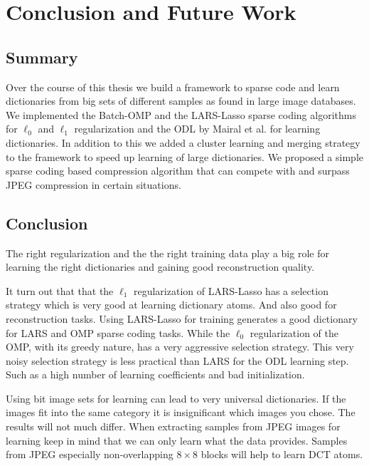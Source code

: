\chapter{Conclusion and Future Work}

\section{Summary}
Over the course of this thesis we build a framework to sparse code and learn
dictionaries from big sets of different samples as found in large image
databases. We implemented the Batch-OMP and the LARS-Lasso sparse coding
algorithms for $\ell_0$ and $\ell_1$ regularization and the ODL by Mairal et
al. for learning dictionaries. 
In addition to this we added a cluster learning and merging strategy to the
framework to speed up learning of large dictionaries.
We proposed a simple sparse coding based compression algorithm that can compete
with and surpass JPEG compression in certain situations.


\section{Conclusion}
The right regularization and the the right training data
play a big role for learning the right dictionaries and gaining
good reconstruction quality. 

It turn out that that the $\ell_1$ regularization of LARS-Lasso has a selection
strategy which is very good at learning dictionary atoms.  And also good for
reconstruction tasks. Using LARS-Lasso for training generates a good dictionary
for LARS and OMP sparse coding tasks.
While the $\ell_0$ regularization of the OMP, with its greedy nature, has a very
aggressive selection strategy.  This very noisy selection strategy is less
practical than LARS for the ODL learning step. Such as a high number of learning
coefficients and bad initialization. 


Using bit image sets for learning can lead to very universal dictionaries. If
the images fit into the same category it is insignificant which images you
chose. The results will not much differ. When extracting samples from JPEG
images for learning keep in mind that we can only learn what the data provides.
Samples from JPEG especially non-overlapping $8 \times 8$ blocks will help to
learn DCT atoms.


